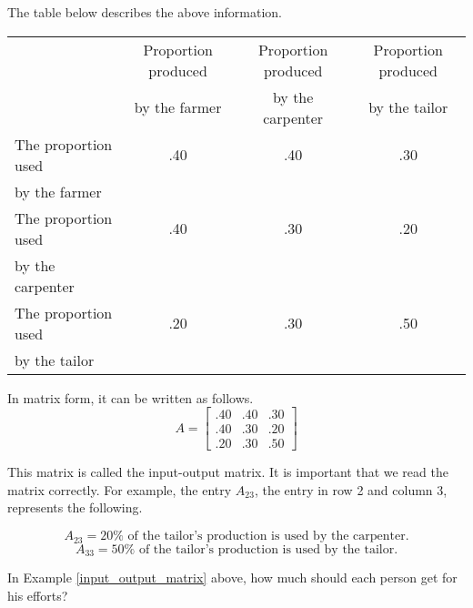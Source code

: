 \begin{solution}
    The table below describes the above information.

    \begin{center}
        \begin{tabular}{lccc}
            \hline
                                & Proportion produced & Proportion produced & Proportion produced \\
                                & by the farmer       & by the carpenter    & by the tailor       \\
            \hline
            The proportion used & .40                 & .40                 & .30                 \\
            by the farmer       &                     &                     &                     \\
            The proportion used & .40                 & .30                 & .20                 \\
            by the carpenter    &                     &                     &                     \\
            The proportion used & .20                 & .30                 & .50                 \\
            by the tailor       &                     &                     &                     \\
            \hline
        \end{tabular}
    \end{center}

    In matrix form, it can be written as follows.
    \[ A = \begin{bmatrix}
            .40 & .40 & .30 \\
            .40 & .30 & .20 \\
            .20 & .30 & .50
        \end{bmatrix} \]

    This matrix is called the input-output matrix. It is important that we read the matrix correctly. For example, the entry \( A_{23} \), the entry in row 2 and column 3, represents the following.

    \[ A_{23} = 20\% \text{ of the tailor's production is used by the carpenter.} \]
    \[ A_{33} = 50\% \text{ of the tailor's production is used by the tailor.} \]
\end{solution}

\begin{example}
    In Example \ref{input_output_matrix} above, how much should each person get for his efforts?
\end{example}

